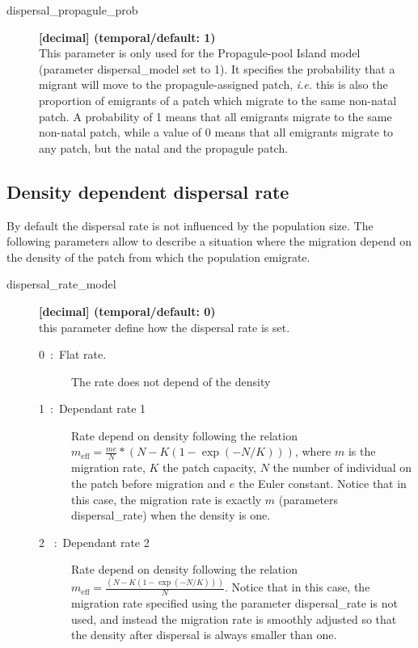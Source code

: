 \documentclass[letterpaper,12pt,oneside]{book}
\begin{document}
\begin{description}
\item[dispersal\_propagule\_prob] \textbf{[decimal] (temporal/default: 1)}\\
This parameter is only used for the Propagule-pool Island model (parameter \textsf{dispersal\_model} set to 1). It specifies the probability that a migrant will move to the propagule-assigned patch, \textit{i.e.} this is also the proportion of emigrants of a patch which migrate to the same non-natal patch. A probability of 1 means that all emigrants migrate to the same non-natal patch, while a value of 0 means that all emigrants migrate to any patch, but the natal and the propagule patch. 

\end{description}

\subsection{Density dependent dispersal rate}
By default the dispersal rate is not influenced by the population size. The following parameters allow to describe a situation where the migration depend on the density of the patch from which the population emigrate. 

 \begin{description}
\item[dispersal\_rate\_model] \textbf{[decimal] (temporal/default: 0)}\\
this parameter define how the dispersal rate is set.
\begin{description}
                  \item[0~:~Flat rate.] The rate does not depend of the density
                  \item [1~:~Dependant rate 1] Rate depend on density following the relation $ m_{\text{eff}} = \frac{me}{N}*(N-K(1-\exp(-N/K)))$, where $m$ is the migration rate, $K$ the patch capacity, $N$ the number of individual on the patch before migration and $e$ the Euler constant. Notice that in this case, the migration rate is exactly $m$ (parameters \textsf{dispersal\_rate}) when the density is one.
                   \item [2 ~:~Dependant rate 2] Rate depend on density following the relation $m_{\text{eff}} =\frac{(N-K(1-\exp(-N/K)))}{N}$. Notice that in this case, the migration rate specified using the parameter \textsf{dispersal\_rate} is not used, and instead the migration rate is smoothly adjusted so that the density after dispersal is always smaller than one. 
\end{description}
\end{description}
\end{document}

